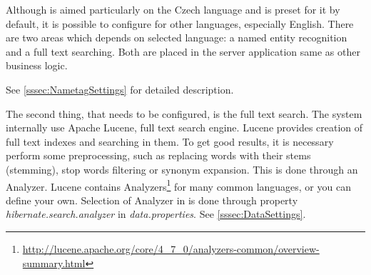 
Although \textan{} is aimed particularly on the Czech language and is preset for
it by default, it is possible to configure \textan{} for other languages, especially
English. There are two areas which depends on selected language: a named entity
recognition and a full text searching. Both are placed in the server application
same as other business logic.

See \ref{sssec:NametagSettings} for detailed description.

The second thing, that needs to be configured, is the full text search. The system
internally use Apache Lucene, full text search engine. Lucene provides creation
of full text indexes and searching in them. To get good results, it is necessary
perform some preprocessing, such as replacing words with their stems (stemming),
stop words filtering or synonym expansion. This is done through an Analyzer. Lucene
contains Analyzers\footnote{\url{http://lucene.apache.org/core/4_7_0/analyzers-common/overview-summary.html}}
for many common languages, or you can define your own. Selection of Analyzer in 
\textan{} is done through property \emph{hibernate.search.analyzer} in \emph{data.properties}.
See \ref{sssec:DataSettings}.

